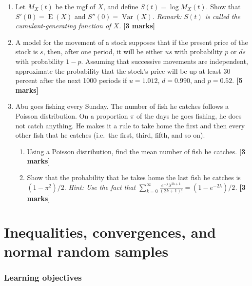\documentclass[
]{book}
\DeclareMathOperator{\E}{E}
\DeclareMathOperator{\Var}{Var}
\theoremstyle{definition}
\theoremstyle{definition}
\theoremstyle{definition}
\theoremstyle{definition}
\theoremstyle{remark}
\begin{document}
\begin{enumerate}
\def\labelenumi{\arabic{enumi}.}
\item
  Let \(M_X(t)\) be the mgf of \(X\), and define \(S(t) = \log M_X(t)\). Show that \(S'(0)= \E(X)\) and \(S''(0)= \Var(X)\). \emph{Remark: \(S(t)\) is called the cumulant-generating function of \(X\).} \textbf{{[}3 marks{]}}
\item
  A model for the movement of a stock supposes that if the present price of the stock is \(s\), then, after one period, it will be either \(us\) with probability \(p\) or \(ds\) with probability \(1-p\). Assuming that successive movements are independent, approximate the probability that the stock's price will be up at least 30 percent after the next 1000 periods if \(u = 1.012\), \(d = 0.990\), and \(p = 0.52\). \textbf{{[}5 marks{]}}
\item
  Abu goes fishing every Sunday. The number of fish he catches follows a Poisson distribution. On a proportion \(\pi\) of the days he goes fishing, he does not catch anything. He makes it a rule to take home the first and then every other fish that he catches (i.e.~the first, third, fifth, and so on).

  \begin{enumerate}
  \def\labelenumii{(\alph{enumii})}
  \item
    Using a Poisson distribution, find the mean number of fish he catches. \textbf{{[}3 marks{]}}
  \item
    Show that the probability that he takes home the last fish he catches is \((1-\pi^2)/2\). \emph{Hint: Use the fact that \(\sum_{k=0}^\infty\frac{e^{-\lambda}\lambda^{2k+1}}{(2k+1)!}=(1-e^{-2\lambda})/2\).} \textbf{{[}3 marks{]}}
  \end{enumerate}
\end{enumerate}

\hypertarget{inequalities-convergences-and-normal-random-samples}{%
\chapter{Inequalities, convergences, and normal random samples}\label{inequalities-convergences-and-normal-random-samples}}

\hypertarget{learning-objectives-2}{%
\subsection*{Learning objectives}\label{learning-objectives-2}}
\end{document}
